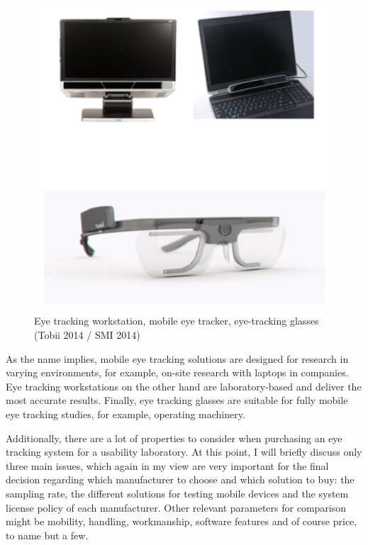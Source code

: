 \documentclass[output=paper]{langsci/langscibook}
\begin{document}
 
\begin{figure}
 \includegraphics[width=\textwidth]{figures/Roesener3.png}
 \caption{Eye tracking workstation, mobile eye tracker, eye-tracking glasses (Tobii 2014 / SMI 2014)}
 \label{roesener:fig:3}
\end{figure} 


As the name implies, mobile eye tracking solutions are designed for research in varying environments, for example, on-site research with laptops in companies. Eye tracking workstations on the other hand are laboratory-based and deliver the most accurate results. Finally, eye tracking glasses are suitable for fully mobile eye tracking studies, for example, operating machinery.


Additionally, there are a lot of properties to consider when purchasing an eye tracking system for a usability laboratory. At this point, I will briefly discuss only three main issues, which again in my view are very important for the final decision regarding which manufacturer to choose and which solution to buy: the sampling rate, the different solutions for testing mobile devices and the system license policy of each manufacturer. Other relevant parameters for comparison might be mobility, handling, workmanship, software features and of course price, to name but a few. 
\end{document}
